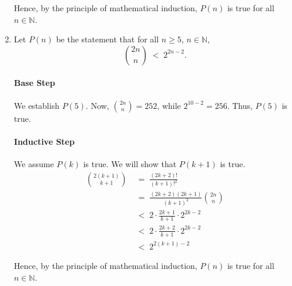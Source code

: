 \documentclass[10pt]{article}
\begin{document}
\begin{enumerate}
                Hence, by the principle of mathematical induction, $P(n)$ is true for all $n \in \mathbb{N}$.

                \item Let $P(n)$ be the statement that for all $n \geq 5$, $n \in \mathbb{N}$,
                \[\binom{2n}{n} \;<\; 2^{2n - 2}.\]
                \paragraph{Base Step}
                We establish $P(5)$. Now, $\binom{2n}{n} = 252$, while $2^{10 - 2} = 256$. Thus, $P(5)$ is true.
                \paragraph{Inductive Step}
                We assume $P(k)$ is true. We will show that $P(k + 1)$ is true.
                \begin{align*}
                \binom{2(k + 1)}{k + 1} \;&=\; \frac{(2k + 2)!}{(k + 1)!^2} \\
                        \;&=\; \frac{(2k + 2)(2k + 1)}{(k + 1)^2} \binom{2n}{n} \\
                        \;&<\; 2\cdot \frac{2k + 1}{k + 1} \cdot 2^{2k - 2} \\
                        \;&<\; 2\cdot \frac{2k + 2}{k + 1} \cdot 2^{2k - 2} \\
                        \;&<\; 2^{2(k + 1) - 2}
                \end{align*}
                
                Hence, by the principle of mathematical induction, $P(n)$ is true for all $n \in \mathbb{N}$.
        \end{enumerate}
\end{document}
